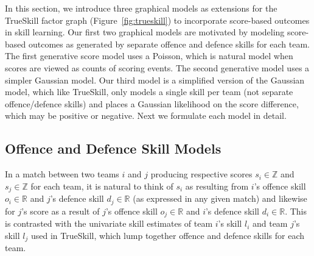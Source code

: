 

In this section, we introduce three graphical models as extensions for
the TrueSkill factor graph (Figure~\ref{fig:trueskill}) to incorporate
score-based outcomes in skill learning.  Our first two graphical
models are motivated by modeling score-based outcomes as generated by
separate offence and defence skills for each team.  The first
generative score model uses a Poisson, which is natural model when
scores are viewed as counts of scoring events.  The second generative
model uses a simpler Gaussian model.  Our third model is a simplified
version of the Gaussian model, which like TrueSkill, only models a
single skill per team (not separate offence/defence skills) and places
a Gaussian likelihood on the score difference, which may be positive
or negative.  Next we formulate each model in detail.

\subsection{Offence and Defence Skill Models}
\label{sec:PoissonGraphicalModel}

In a match between two teams $i$ and $j$ producing respective scores
$s_i \in \mathbb{Z}$ and $s_j \in \mathbb{Z}$ for each team, it is natural to
think of $s_i$ as resulting from $i$'s offence skill $o_i \in \mathbb{R}$
and $j$'s defence skill $d_j \in \mathbb{R}$
(as expressed in any given match) and
likewise for $j$'s score as a result of $j$'s offence skill
$o_j \in \mathbb{R}$
and $i$'s defence skill $d_i \in \mathbb{R}$.  This is contrasted
with the univariate skill estimates of team $i$'s skill $l_i$
and team $j$'s skill $l_j$ used in TrueSkill, which lump together
offence and defence skills for each team.

